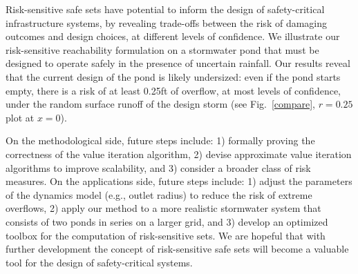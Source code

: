 \documentclass[letterpaper, 10 pt, conference]{ieeeconf}  %
\newcommand{\mpc}[1]{{\color{cyan} #1}}
\newcommand{\mpc}[1]{#1}
\begin{document}
Risk-sensitive safe sets have potential to inform the design of safety-critical infrastructure systems,
by revealing trade-offs between the risk of damaging outcomes and design choices, at different levels of confidence.
We illustrate our risk-sensitive reachability formulation on a stormwater pond that must be designed to operate safely in the presence of uncertain rainfall. 
Our results reveal that the current design of the pond is likely undersized: even if the pond starts empty, 
there is a risk of at least 0.25ft of overflow, at most levels of confidence, 
under the random surface runoff of the design storm (see Fig.~\ref{compare}, $r=0.25$ plot at $x=0$).

\mpc{On the methodological side, future steps include: 1) formally proving the correctness of the value iteration algorithm, 2) devise approximate value iteration algorithms to improve scalability, and 3) consider a broader class of risk measures.} On the applications side, future steps include: 1) adjust the parameters of the dynamics model (e.g., outlet radius) to reduce the risk of extreme overflows, 
2) apply our method to a more realistic stormwater system that consists of two ponds in series on a larger grid,
and 3) \mpc{develop an optimized toolbox for the computation of risk-sensitive sets.  We are hopeful that with further development the concept of risk-sensitive safe sets will become a valuable tool for the design of safety-critical systems.}

%  
%
\end{document}
